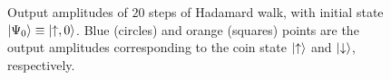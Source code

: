 \begin{figure}[]
    \centering
    \qquad
    \caption{
        Output amplitudes of $20$ steps of Hadamard walk, with initial state $\ket{\Psi_0}\equiv\ket{\uparrow,0}$.
        Blue (circles) and orange (squares) points are the output amplitudes corresponding to the coin state $\ket\uparrow$ and $\ket\downarrow$, respectively.
    }
    \label{fig:hadamardwalk_Nsteps}
\end{figure}



